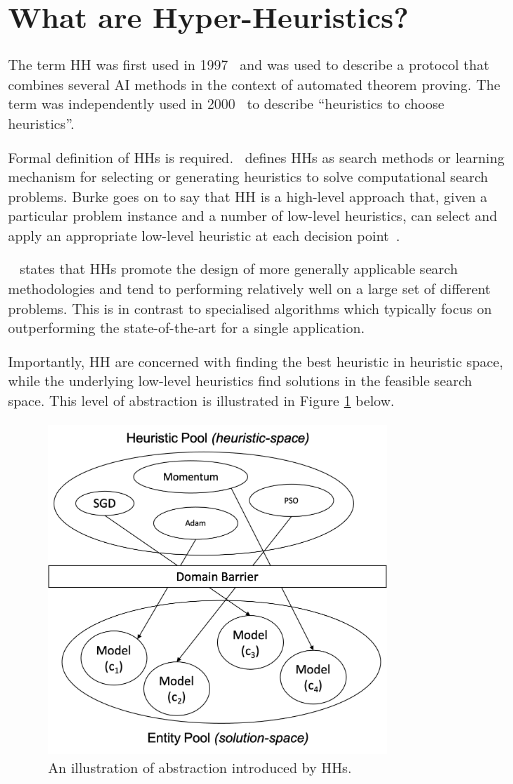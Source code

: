 \section{What are Hyper-Heuristics?}
\label{sec:hh:what_is_a_hh}

The term \acl{HH} was first used in 1997~\cite{ref:burke:2010} and was used to describe a protocol that combines several \ac{AI} methods in the context of automated theorem proving. The term was independently used in 2000~\cite{ref:cowling:2000} to describe ``heuristics to choose heuristics''.

Formal definition of \acp{HH} is required.~\citeauthor{ref:burke:2010}\cite{ref:burke:2010} defines \acp{HH} as search methods or learning mechanism for selecting or generating heuristics to solve computational search problems. Burke goes on to say that \ac{HH} is a high-level approach that, given a particular problem instance and a number of low-level heuristics, can select and apply an appropriate low-level heuristic at each decision point~\cite{ref:burke2003}.

\citeauthor{ref:grobler:2015}~\cite{ref:grobler:2015} states that \acp{HH} promote the design of more generally applicable search methodologies and tend to performing relatively well on a large set of different problems. This is in contrast to specialised algorithms which typically focus on outperforming the state-of-the-art for a single application.

Importantly, \ac{HH} are concerned with finding the best heuristic in heuristic space, while the underlying low-level heuristics find solutions in the feasible search space. This level of abstraction is illustrated in Figure \ref{fig:heuristics:hh:hh_algorithm} below.

\begin{figure}[htbp]
      \begin{centering}
            \includegraphics[width=0.8\textwidth]{images/hh_high_level.png}
            \caption{An illustration of abstraction introduced by \acp{HH}.}
            \label{fig:heuristics:hh:hh_algorithm}
      \end{centering}
\end{figure}

